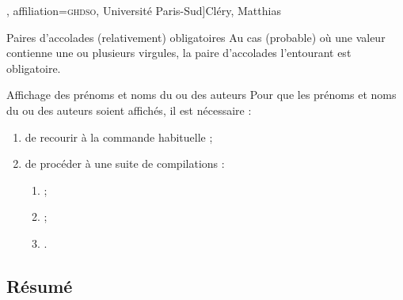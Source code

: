 \documentclass[english,nolocaltoc]{nwejmart}
\newtheorem[style=definition]{fait}
\newtheorem[title=expérience]{experience}
\newtheorem[title-plural=anneaux]{anneau}
\newtheorem[title=idéal,title-plural=idéaux]{ideal}
\begin{document}

\begin{bodycode}
\author[
  affiliation={Laboratoire \textsc{sphere}, Université Paris Diderot}
  ]{Bustamante, Martha-Cecilia}
\author[
  affiliation=[aff2]{\textsc{lpma}, Université Pierre et Marie Curie},
  affiliation={\textsc{ghdso}, Université Paris-Sud}]{Cléry, Matthias}
\author[
  affiliationtagged={aff2}
]{Mazliak, Laurent}
\end{bodycode}

\begin{dbwarning}{Paires d'accolades
    (relativement) obligatoires}{}
  Au cas (probable) où une valeur  contienne une ou plusieurs
  virgules, la paire d'accolades l'entourant est obligatoire.
\end{dbwarning}

\begin{dbwarning}{Affichage des prénoms et noms du ou des auteurs}{}
  Pour que les prénoms et noms du ou des auteurs soient affichés, il est
  nécessaire :
  \begin{enumerate}
  \item de recourir à la commande habituelle  ;
  \item de procéder à une suite de compilations\suitecompilations{} :
    \begin{enumerate}
    \item {} ;
    \item {} ;
    \item {}.
    \end{enumerate}
  \end{enumerate}
\end{dbwarning}

\subsection{Résumé}
\label{sec-resume}
\end{document}
